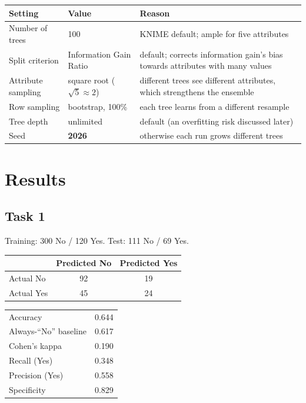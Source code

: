 \documentclass[11pt,a4paper]{article}
\begin{document}
\begin{tabularx}{\linewidth}{@{}p{3.4cm}p{3.4cm}L@{}}
\toprule Setting & Value & Reason \\ \midrule
Number of trees & 100 & KNIME default; ample for five attributes \\
Split criterion & Information Gain Ratio & default; corrects information gain's bias towards attributes with many values \\
Attribute sampling & square root ($\sqrt5 \approx 2$) & different trees see different attributes, which strengthens the ensemble \\
Row sampling & bootstrap, 100\% & each tree learns from a different resample \\
Tree depth & unlimited & default (an overfitting risk discussed later) \\
Seed & \textbf{2026} & otherwise each run grows different trees \\ \bottomrule
\end{tabularx}

\section{Results}

\subsection{Task 1}
Training: 300 No / 120 Yes. Test: 111 No / 69 Yes.

\begin{center}
\begin{tabular}{@{}lcc@{}}\toprule
 & Predicted No & Predicted Yes \\ \midrule
Actual No  & 92 & 19 \\
Actual Yes & 45 & 24 \\ \bottomrule
\end{tabular}\qquad
\begin{tabular}{@{}lr@{}}\toprule
Accuracy & 0.644 \\ Always-``No'' baseline & 0.617 \\ Cohen's kappa & 0.190 \\
Recall (Yes) & 0.348 \\ Precision (Yes) & 0.558 \\ Specificity & 0.829 \\ \bottomrule
\end{tabular}
\end{center}
\end{document}
